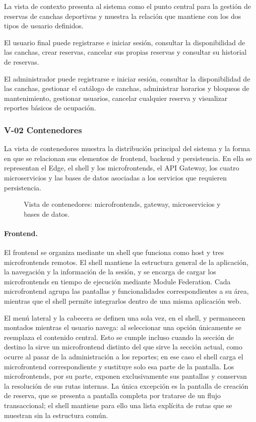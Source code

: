 La vista de contexto presenta al sistema como el punto central para la gestión de
reservas de canchas deportivas y muestra la relación que mantiene con los dos tipos
de usuario definidos.

El usuario final puede registrarse e iniciar sesión, consultar la disponibilidad
de las canchas, crear reservas, cancelar sus propias reservas y consultar su
historial de reservas.

El administrador puede registrarse e iniciar sesión, consultar la disponibilidad
de las canchas, gestionar el catálogo de canchas, administrar horarios y bloqueos
de mantenimiento, gestionar usuarios, cancelar cualquier reserva y visualizar
reportes básicos de ocupación.

\subsubsection{\texorpdfstring{\textsf{V-02}}{V-02} Contenedores}
\label{v:02}

La vista de contenedores muestra la distribución principal del sistema y la forma
en que se relacionan sus elementos de frontend, backend y persistencia. En ella
se representan el Edge, el shell y los microfrontends, el API Gateway, los cuatro
microservicios y las bases de datos asociadas a los servicios que requieren
persistencia.

\begin{figure}[H]
  \centering
  \caption{Vista de contenedores: microfrontends, gateway, microservicios y
           bases de datos.}
  \label{fig:contenedores}
\end{figure}

\paragraph*{Frontend.}

El frontend se organiza mediante un shell que funciona como host y tres
microfrontends remotos. El shell mantiene la estructura general de la aplicación,
la navegación y la información de la sesión, y se encarga de cargar los
microfrontends en tiempo de ejecución mediante Module Federation. Cada
microfrontend agrupa las pantallas y funcionalidades correspondientes a su área,
mientras que el shell permite integrarlos dentro de una misma aplicación web.

El menú lateral y la cabecera se definen una sola vez, en el shell, y permanecen
montados mientras el usuario navega: al seleccionar una opción únicamente se
reemplaza el contenido central. Esto se cumple incluso cuando la sección de
destino la sirve un microfrontend distinto del que sirve la sección actual, como
ocurre al pasar de la administración a los reportes; en ese caso el shell carga
el microfrontend correspondiente y sustituye solo esa parte de la pantalla. Los
microfrontends, por su parte, exponen exclusivamente sus pantallas y conservan la
resolución de sus rutas internas. La única excepción es la pantalla de creación
de reserva, que se presenta a pantalla completa por tratarse de un flujo
transaccional; el shell mantiene para ello una lista explícita de rutas que se
muestran sin la estructura común.

